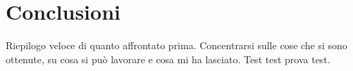 \chapter*{Conclusioni}\label{chap:Conclusione}

Riepilogo veloce di quanto affrontato prima. Concentrarsi sulle cose che si sono ottenute, su cosa si
può lavorare e cosa mi ha lasciato. Test test prova test.
